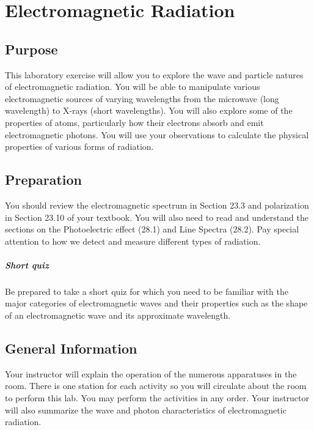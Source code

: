 
\chapter{Electromagnetic Radiation}

\section{Purpose}
	This laboratory exercise will allow you to explore the wave and particle natures of electromagnetic radiation.  You will be able to manipulate various electromagnetic sources of varying wavelengths from the microwave (long wavelength) to X-rays (short wavelengths).  
	You will also explore some of the properties of atoms, particularly how their electrons absorb and emit electromagnetic photons.  You will use your observations to calculate the physical properties of various forms of radiation.

\section{Preparation}
	You should review the electromagnetic spectrum in Section 23.3 and polarization in Section 23.10 of your textbook.  You will also need to read and understand the sections on the Photoelectric effect (28.1) and Line Spectra (28.2).  Pay special attention to how we detect and measure different types of radiation.

\paragraph{Short quiz}
  Be prepared to take a short quiz for which you need to be familiar with the major categories of electromagnetic waves and their properties such as the shape of an electromagnetic wave and its approximate wavelength. 
\section{General Information}

Your instructor will explain the operation of the numerous apparatuses in the room.  There is one station for each activity so you will circulate about the room to perform this lab.  You may perform the activities in any order.
Your instructor will also summarize the wave and photon characteristics of electromagnetic radiation.

